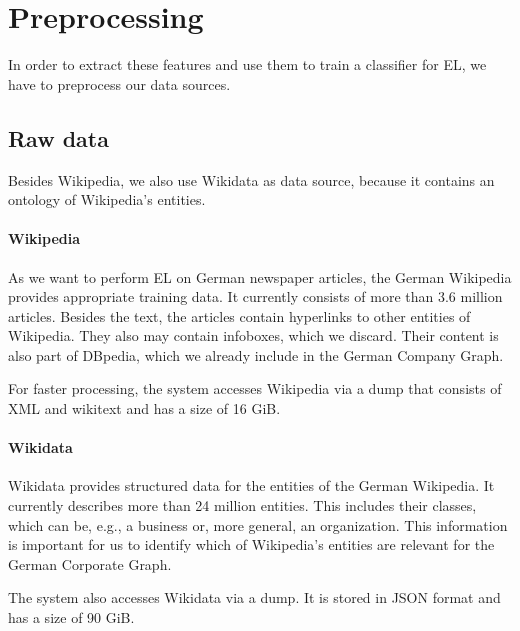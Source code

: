 \section{Preprocessing}
\label{sec:preprocessing}
In order to extract these features and use them to train a classifier for EL, we have to preprocess our data sources.



\subsection{Raw data}
Besides Wikipedia, we also use Wikidata as data source, because it contains an ontology of Wikipedia's entities.


\paragraph{Wikipedia}
As we want to perform EL on German newspaper articles, the German Wikipedia provides appropriate training data. It currently consists of more than 3.6 million articles. Besides the text, the articles contain hyperlinks to other entities of Wikipedia. They also may contain infoboxes, which we discard. Their content is also part of DBpedia\footnotemark{}, which we already include in the German Company Graph.

For faster processing, the system accesses Wikipedia via a dump\footnotemark{} that consists of XML and wikitext and has a size of 16 GiB.


\paragraph{Wikidata}
Wikidata\footnotemark{} provides structured data for the entities of the German Wikipedia. It currently describes more than 24 million entities. This includes their classes, which can be, e.g., a business or, more general, an organization. This information is important for us to identify which of Wikipedia's entities are relevant for the German Corporate Graph.

The system also accesses Wikidata via a dump\footnotemark{}. It is stored in JSON format and has a size of 90 GiB.



